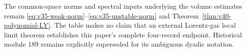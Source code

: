 The common-space norms and spectral inputs underlying the volume
estimates remain \eqref{eq:v35-weak-norm}--\eqref{eq:v35-unstable-norm}
and Theorem~\ref{thm:v40-polynomial-LY}. The table makes no claim
that an external Lorentz-gas local limit theorem establishes this
paper's complete four-record endpoint. Historical module 189 remains
explicitly superseded for its ambiguous dyadic notation.
\clearpage
